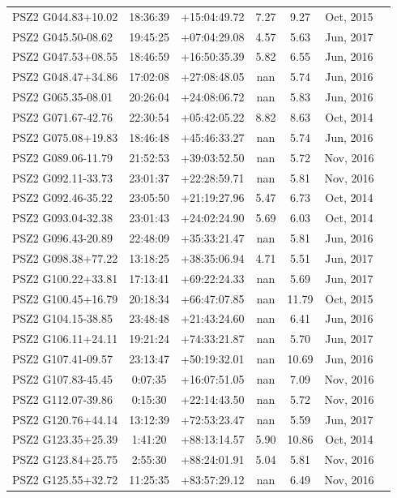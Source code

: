 \documentclass[apj, revtex4]{emulateapj}
\begin{document}
\begin{longtable*}{lcccccc}
PSZ2 G044.83+10.02 & 18:36:39 & +15:04:49.72 & 7.27 & 9.27 & Oct, 2015\\
PSZ2 G045.50-08.62 & 19:45:25 & +07:04:29.08 & 4.57 & 5.63 & Jun, 2017\\
PSZ2 G047.53+08.55 & 18:46:59 & +16:50:35.39 & 5.82 & 6.55 & Jun, 2016\\
PSZ2 G048.47+34.86 & 17:02:08 & +27:08:48.05 & nan & 5.74 & Jun, 2016\\
PSZ2 G065.35-08.01 & 20:26:04 & +24:08:06.72 & nan & 5.83 & Jun, 2016\\
PSZ2 G071.67-42.76 & 22:30:54 & +05:42:05.22 & 8.82 & 8.63 & Oct, 2014\\
PSZ2 G075.08+19.83 & 18:46:48 & +45:46:33.27 & nan & 5.74 & Jun, 2016\\
PSZ2 G089.06-11.79 & 21:52:53 & +39:03:52.50 & nan & 5.72 & Nov, 2016\\
PSZ2 G092.11-33.73 & 23:01:37 & +22:28:59.71 & nan & 5.81 & Nov, 2016\\
PSZ2 G092.46-35.22 & 23:05:50 & +21:19:27.96 & 5.47 & 6.73 & Oct, 2014\\
PSZ2 G093.04-32.38 & 23:01:43 & +24:02:24.90 & 5.69 & 6.03 & Oct, 2014\\
PSZ2 G096.43-20.89 & 22:48:09 & +35:33:21.47 & nan & 5.81 & Jun, 2016\\
PSZ2 G098.38+77.22 & 13:18:25 & +38:35:06.94 & 4.71 & 5.51 & Jun, 2017\\
PSZ2 G100.22+33.81 & 17:13:41 & +69:22:24.33 & nan & 5.69 & Jun, 2017\\
PSZ2 G100.45+16.79 & 20:18:34 & +66:47:07.85 & nan & 11.79 & Oct, 2015\\
PSZ2 G104.15-38.85 & 23:48:48 & +21:43:24.60 & nan & 6.41 & Jun, 2016\\
PSZ2 G106.11+24.11 & 19:21:24 & +74:33:21.87 & nan & 5.70 & Jun, 2017\\
PSZ2 G107.41-09.57 & 23:13:47 & +50:19:32.01 & nan & 10.69 & Jun, 2016\\
PSZ2 G107.83-45.45 & 0:07:35 & +16:07:51.05 & nan & 7.09 & Nov, 2016\\
PSZ2 G112.07-39.86 & 0:15:30 & +22:14:43.50 & nan & 5.72 & Nov, 2016\\
PSZ2 G120.76+44.14 & 13:12:39 & +72:53:23.47 & nan & 5.59 & Jun, 2017\\
PSZ2 G123.35+25.39 & 1:41:20 & +88:13:14.57 & 5.90 & 10.86 & Oct, 2014\\
PSZ2 G123.84+25.75 & 2:55:30 & +88:24:01.91 & 5.04 & 5.81 & Nov, 2016\\
PSZ2 G125.55+32.72 & 11:25:35 & +83:57:29.12 & nan & 6.49 & Nov, 2016\\

\end{longtable*}
\end{document}
